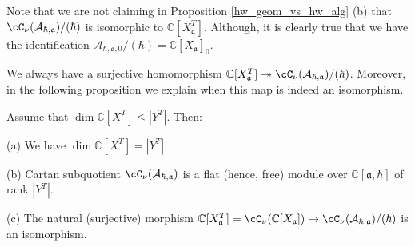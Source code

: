 \documentclass[12pt]{amsart}
\begin{document}
Note that we are not claiming in Proposition \ref{hw_geom_vs_hw_alg} (b) that $\cC_\nu(\mathcal{A}_{\hbar,\mathfrak{a}})/(\hbar)$ is isomorphic to $\mathbb{C}[X^T_{\mathfrak{a}}]$. Although, it is clearly true that we have the identification $\mathcal{A}_{\hbar,\mathfrak{a},0}/(\hbar) = \mathbb{C}[X_{\mathfrak{a}}]_0$. 


We always have a surjective homomorphism $\mathbb{C}[X^T_{\mathfrak{a}}] \twoheadrightarrow \cC_\nu(\mathcal{A}_{\hbar,\mathfrak{a}})/(\hbar)$. Moreover, %
in the following proposition 
we explain when this map is indeed an isomorphism. 
\begin{prop}\label{prop_when_cartan_hbar_commute} %
Assume that $\operatorname{dim}\mathbb{C}[X^{T}] \leqslant |Y^{T}|$. Then: 

(a) We have $\operatorname{dim}\mathbb{C}[X^{T}] = |Y^{T}|$.

(b) Cartan subquotient $\cC_\nu(\mathcal{A}_{\hbar,\mathfrak{a}})$ is a flat (hence, free) module over $\mathbb{C}[\mathfrak{a},\hbar]$ of rank $|Y^{T}|$. 

(c) The natural (surjective) morphism $\mathbb{C}[X_{\mathfrak{a}}^{T}]=\cC_\nu(\mathbb{C}[X_{\mathfrak{a}}]) \rightarrow \cC_\nu(\mathcal{A}_{\hbar,\mathfrak{a}})/(\hbar)$ is an isomorphism.
\end{prop}
\end{document}
